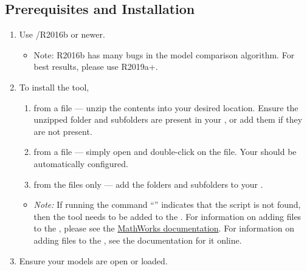 \documentclass{article}
\begin{document}
\subsection{Prerequisites and Installation}

\begin{enumerate}
  \item Use \Matlab/\Simulink R2016b or newer.
		\begin{itemize}
			\item Note: R2016b has many bugs in the model comparison algorithm. For best results, please use R2019a+.
		\end{itemize}
	\item To install the tool,
	\begin{enumerate}
		\item from a  file --- unzip the contents into your desired location. Ensure the unzipped folder and subfolders are present in your \mpath, or add them if they are not present. %
		\item from a  file --- simply open \Matlab and double-click on the file. Your \mpath should be automatically configured.
		\item from the files only --- add the folders and subfolders to your \mpath. %
	\end{enumerate}
	\begin{itemize}
		\item \textit{Note:} If running the command ``'' indicates that the script is not found, then the tool needs to be added to the \mpath.
		For information on adding files to the \mpath, please see the \href{https://www.mathworks.com/help/matlab/matlab_env/add-remove-or-reorder-folders-on-the-search-path.html}{MathWorks documentation}.
		For information on adding files to the \mpath, see the documentation for it online.
	\end{itemize}
	\item Ensure your models are open or loaded.
\end{enumerate}
\end{document}
